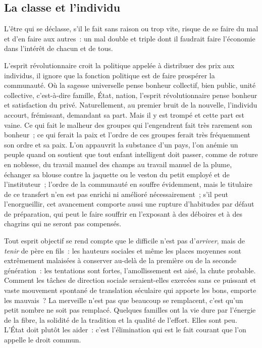\documentclass[french,twoside]{book} %
\begin{document}
\subsection[La classe et l’individu]{La classe et l’individu}
\noindent L’être qui se déclasse, s’il le fait sans raison ou trop vite, risque de se faire du mal et d’en faire aux autres : un mal double et triple dont il faudrait faire l’économie dans l’intérêt de chacun et de tous.\par
L’esprit révolutionnaire croit la politique appelée à distribuer des prix aux individus, il ignore que la fonction politique est de faire prospérer la communauté. Où la sagesse universelle pense bonheur collectif, bien public, unité collective, c’est-à-dire famille, État, nation, l’esprit révolutionnaire pense bonheur et satisfaction du privé. Naturellement, au premier bruit de la nouvelle, l’individu accourt, frémissant, demandant sa part. Mais il y est trompé et cette part est vaine. Ce qui fait le malheur des groupes qui l’engendrent fait très rarement son bonheur ; ce qui ferait la paix et l’ordre de ces groupes ferait très fréquemment son ordre et sa paix. L’on appauvrit la substance d’un pays, l’on anémie un peuple quand on soutient que tout enfant intelligent doit passer, comme de roture en noblesse, du travail manuel des champs au travail manuel de la plume, échanger sa blouse contre la jaquette ou le veston du petit employé et de l’instituteur ; l’ordre de la communauté en souffre évidemment, mais le titulaire de ce transfert n’en est pas enrichi ni amélioré nécessairement ; s’il peut l’enorgueillir, cet avancement comporte aussi une rupture d’habitudes par défaut de préparation, qui peut le faire souffrir en l’exposant à des déboires et à des chagrins qui ne seront pas compensés.\par
Tout esprit objectif se rend compte que le difficile n’est pas d’\emph{arriver}, mais de \emph{tenir} de père en fils : les hauteurs sociales et même les places moyennes sont extrêmement malaisées à conserver au-delà de la première ou de la seconde génération : les tentations sont fortes, l’amollissement est aisé, la chute probable. Comment les tâches de direction sociale seraient-elles exercées sans ce puissant et vaste mouvement spontané de translation séculaire qui apporte les bons, emporte les mauvais ? La merveille n’est pas que beaucoup se remplacent, c’est qu’un petit nombre ne soit pas remplacé. Quelques familles ont la vie dure par l’énergie de la fibre, la solidité de la tradition et la qualité de l’effort. Elles sont peu. L’État doit plutôt les aider : c’est l’élimination qui est le fait courant que l’on appelle le droit commun.\par
\end{document}

